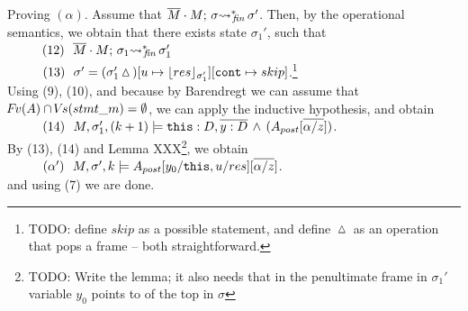 \begin{description}
 \vspace{.1cm}
Proving $(\alpha)$. Assume that   $\leadstoBoundedStarFin  {\Mtwo\cdot M}  {\sigma}  {\sigma'}$. Then, by the operational semantics, we obtain that 
there exists state $\sigma_1'$, such that \\
$\SPS (12) \ \ \leadstoBoundedStarFin  {\Mtwo\cdot M}  {\sigma_1}  {\sigma_1'}$ \\
$\SPS (13) \ \ \sigma'=(\sigma_1'\popSymbol)[u \mapsto {\interpret {\sigma_1'} {res}}][\prg{cont}\mapsto skip]$.\footnote{TODO: define $skip$ as a possible statement, and define $\popSymbol$ as an operation that pops a frame -- both straightforward.}
\\
Using (9), (10), and because by Barendregt we can assume that $\fv(A)\cap \vs(stmt\_m) = \emptyset$, we can apply the inductive hypothesis, and obtain\\
$\SPS (14) \ \  \satDAssertFrom M  {\sigma_1'} {(k+1)}   {\prg{this}:D,\overline{y:D}\, \wedge\, (A_{post}[\overline{\alpha/z}])}$.
\\
By (13), (14) and Lemma XXX\footnote{TODO: Write the lemma; it also needs that in the penultimate frame in $\sigma_1'$ variable $y_0$ points to  of the top in $\sigma$}, we obtain\\
$\SPS (\alpha') \ \  \satDAssertFrom M  {\sigma'} {k}   {A_{post}[y_0/ \prg{this},u/res][\overline{\alpha/z}]}$.\\
and using (7) we are done.


\end{description}
